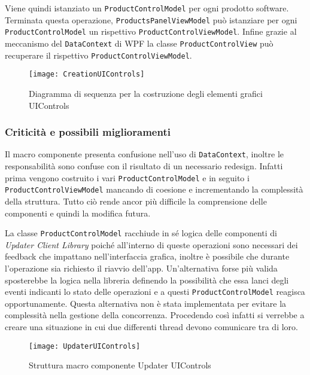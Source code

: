 \documentclass[../RelazioneFinale.tex]{subfiles}
\begin{document}
				Viene quindi istanziato un \verb|ProductControlModel| per ogni prodotto software. Terminata questa operazione, \verb|ProductsPanelViewModel| può istanziare per ogni \verb|ProductControlModel| un rispettivo \verb|ProductControlViewModel|.
				Infine grazie al meccanismo del \verb|DataContext| di WPF la classe \verb|ProductControlView| può recuperare il rispettivo \verb|ProductControlViewModel|.
				
			\begin{figure}[h]
				\texttt{[image: CreationUIControls]}
				\label{fig:CreationUIControls}
				\caption{Diagramma di sequenza per la costruzione degli elementi grafici UIControls}
			\end{figure}
			
			\subsubsection{Criticità e possibili miglioramenti}
				Il macro componente presenta confusione nell'uso di \verb|DataContext|, inoltre le responsabilità sono confuse con il risultato di un necessario redesign. Infatti prima vengono costruito i vari \verb|ProductControlModel| e in seguito i \verb|ProductControlViewModel| mancando di coesione e incrementando la complessità della struttura. Tutto ciò rende ancor più difficile la comprensione delle componenti e quindi la modifica futura.
				
				La classe \verb|ProductControlModel| racchiude in sé logica delle componenti di \emph{Updater Client Library} poiché all'interno di queste operazioni sono necessari dei feedback che impattano nell'interfaccia grafica, inoltre è possibile che durante l'operazione sia richiesto il riavvio dell'app. Un'alternativa forse più valida sposterebbe la logica nella libreria definendo la possibilità che essa lanci degli eventi indicanti lo stato delle operazioni e a questi \verb|ProductControlModel| reagisca opportunamente. Questa alternativa non è stata implementata per evitare la complessità nella gestione della concorrenza. Procedendo così infatti si verrebbe a creare una situazione in cui due differenti thread devono comunicare tra di loro.

			\vfill						
			\begin{figure}[h]
				\texttt{[image: UpdaterUIControls]}
				\label{fig:UpdaterUIControls}
				\caption{Struttura macro componente Updater UIControls}
			\end{figure}
\end{document}
